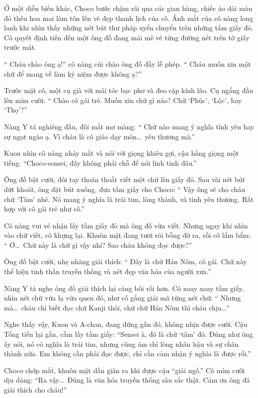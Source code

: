 \documentclass[../main.tex]{subfiles}
\begin{document}
Ở một diễn biến khác, Choco bước chậm rãi qua các gian hàng, chiếc áo dài màu đỏ thêu hoa mai làm tôn lên vẻ đẹp thanh lịch của cô. Ánh mắt của cô nàng long lanh khi nhìn thấy những nét bút thư pháp uyển chuyển trên những tấm giấy đỏ. Cô quyết định tiến đến một ông đồ đang mải mê vẽ từng đường nét trên tờ giấy trước mặt.

``{\color{red} Cháu chào ông ạ!}'' cô nàng cúi chào ông đồ đầy lễ phép. ``{\color{red} Cháu muốn xin một chữ để mang về làm kỷ niệm được không ạ?}''

Trước mặt cô, một cụ già với mái tóc bạc phơ và đeo cặp kính lão. Cụ ngẩng đầu lên mỉm cười: ``{\color{red} Chào cô gái trẻ. Muốn xin chữ gì nào? Chữ `Phúc', `Lộc', hay `Thọ'?}''

Nàng Y tá nghiêng đầu, đôi mắt mơ màng: ``{\color{red} Chữ nào mang ý nghĩa tình yêu hay sự ngọt ngào ạ. Vì cháu là cô giáo dạy môn\dots\ yêu thương mà.}''

Kuon nhìn cô nàng nháy mắt và nói với giọng khiêu gợi, cậu hắng giọng một tiếng: ``Choco-sensei, đây không phải chỗ để nói linh tinh đâu.''

Ông đồ bật cười, đôi tay thoăn thoắt viết một chữ lên giấy đỏ. Sau vài nét bút dứt khoát, ông đặt bút xuống, đưa tấm giấy cho Choco: ``{\color{red} Vậy ông sẽ cho cháu chữ `Tâm' nhé. Nó mang ý nghĩa là trái tim, lòng thành, và tình yêu thương. Rất hợp với cô gái trẻ như cô.}''

Cô nàng vui vẻ nhận lấy tấm giấy đỏ mà ông đồ vừa viết. Nhưng ngay khi nhìn vào chữ viết, cô khựng lại. Khuôn mặt đang tươi rói bỗng đờ ra, rồi cô lẩm bẩm: ``{\color{red} Ơ\dots\ Chữ này là chữ gì vậy nhỉ? Sao cháu không đọc được?}''

Ông đồ bật cười, nhẹ nhàng giải thích: ``{\color{red} Đây là chữ Hán Nôm, cô gái. Chữ này thể hiện tinh thần truyền thống và nét đẹp văn hóa của người xưa.}''

Nàng Y tá nghe ông đồ giải thích lại càng bối rối hơn. Cô xoay xoay tấm giấy, nhìn nét chữ vừa lạ vừa quen đó, như cố gắng giải mã từng nét chữ: ``{\color{red} Nhưng mà\dots\ cháu chỉ biết đọc chữ Kanji thôi, chứ chữ Hán Nôm thì cháu chịu\dots}''

Nghe thấy vậy, Kuon và A-chan, đang đứng gần đó, không nhịn được cười. Cậu Tổng tiến lại gần, cầm lấy tấm giấy: ``Sensei à, đó là chữ `tâm' đó. Đúng như ông ấy nói, nó có nghĩa là trái tim, nhưng cũng ám chỉ lòng nhân hậu và sự chân thành nữa. Em không cần phải đọc được, chỉ cần cảm nhận ý nghĩa là được rồi.''

Choco chớp mắt, khuôn mặt dần giãn ra khi được cậu ``giải ngố.'' Cô mỉm cười dịu dàng: ``Ra vậy\dots\ Đúng là văn hóa truyền thống sâu sắc thật. {\color{red} Cảm ơn ông đã giải thích cho cháu!}''
\end{document}

